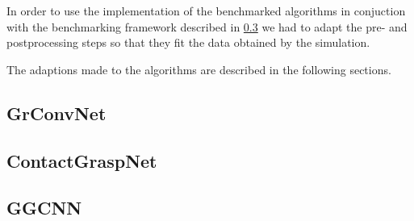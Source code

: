 In order to use the implementation of the benchmarked algorithms in conjuction with the benchmarking framework described in \ref{} we had to adapt
the pre- and postprocessing steps so that they fit the data obtained by the simulation.

The adaptions made to the algorithms are described in the following sections.

\subsection{GrConvNet}
\subsection{ContactGraspNet}
\subsection{GGCNN}
